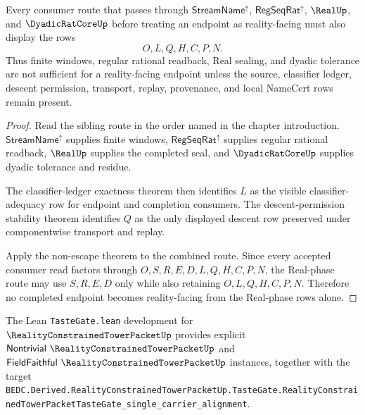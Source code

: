 \begin{theorem}
\label{thm:reality-constrained-tower-packet-real-phase-consumer-boundary}
Every consumer route that passes through $\mathsf{StreamName}^{\uparrow}$, $\mathsf{RegSeqRat}^{\uparrow}$, $\RealUp$, and $\DyadicRatCoreUp$ before treating an endpoint as reality-facing must also display the rows
$$
O,L,Q,H,C,P,N.
$$
Thus finite windows, regular rational readback, Real sealing, and dyadic tolerance are not sufficient for a reality-facing endpoint unless the source, classifier ledger, descent permission, transport, replay, provenance, and local NameCert rows remain present.
\end{theorem}
\begin{proof}
Read the sibling route in the order named in the chapter introduction. $\mathsf{StreamName}^{\uparrow}$ supplies finite windows, $\mathsf{RegSeqRat}^{\uparrow}$ supplies regular rational readback, $\RealUp$ supplies the completed seal, and $\DyadicRatCoreUp$ supplies dyadic tolerance and residue.

The classifier-ledger exactness theorem then identifies $L$ as the visible classifier-adequacy row for endpoint and completion consumers. The descent-permission stability theorem identifies $Q$ as the only displayed descent row preserved under componentwise transport and replay.

Apply the non-escape theorem to the combined route. Since every accepted consumer read factors through $O,S,R,E,D,L,Q,H,C,P,N$, the Real-phase route may use $S,R,E,D$ only while also retaining $O,L,Q,H,C,P,N$. Therefore no completed endpoint becomes reality-facing from the Real-phase rows alone.
\end{proof}



The Lean \texttt{TasteGate.lean} development for $\RealityConstrainedTowerPacketUp$ provides explicit $\mathsf{Nontrivial}\ \RealityConstrainedTowerPacketUp$ and $\mathsf{FieldFaithful}\ \RealityConstrainedTowerPacketUp$ instances, together with the target \texttt{BEDC.Derived.RealityConstrainedTowerPacketUp.TasteGate.RealityConstrainedTowerPacketTasteGate\_single\_carrier\_alignment}.

